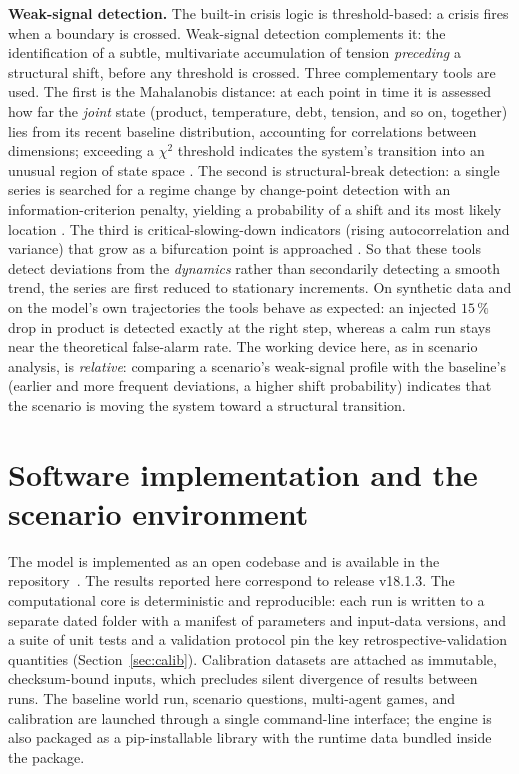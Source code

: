 \documentclass[a4paper,fleqn]{cas-sc}
\begin{document}
\textbf{Weak-signal detection.} The built-in crisis logic is threshold-based: a crisis fires when a
boundary is crossed. Weak-signal detection complements it: the identification of a subtle,
multivariate accumulation of tension \emph{preceding} a structural shift, before any threshold is
crossed. Three complementary tools are used. The first is the Mahalanobis distance: at each point in
time it is assessed how far the \emph{joint} state (product, temperature, debt, tension, and so on,
together) lies from its recent baseline distribution, accounting for correlations between
dimensions; exceeding a $\chi^2$ threshold indicates the system's transition into an unusual region
of state space \citep{mahalanobis1936,wilson1931}. The second is structural-break detection: a
single series is searched for a regime change by change-point detection with an information-criterion
penalty, yielding a probability of a shift and its most likely location \citep{schwarz1978}. The
third is critical-slowing-down indicators (rising autocorrelation and variance) that grow as a
bifurcation point is approached \citep{scheffer2009}. So that these tools detect deviations from the
\emph{dynamics} rather than secondarily detecting a smooth trend, the series are first reduced to
stationary increments. On synthetic data and on the model's own trajectories the tools behave as
expected: an injected $15\,\%$ drop in product is detected exactly at the right step, whereas a calm
run stays near the theoretical false-alarm rate. The working device here, as in scenario analysis,
is \emph{relative}: comparing a scenario's weak-signal profile with the baseline's (earlier and more
frequent deviations, a higher shift probability) indicates that the scenario is moving the system
toward a structural transition.

\section{Software implementation and the scenario environment}
\label{sec:repo}

The model is implemented as an open codebase and is available in the repository~\citep{theclimateguy2026gim}. 
The results reported here correspond to release
v18.1.3. The computational core is deterministic and
reproducible: each run is written to a separate dated folder with a manifest of parameters and
input-data versions, and a suite of unit tests and a validation protocol pin the key
retrospective-validation quantities (Section~\ref{sec:calib}). Calibration datasets are attached as
immutable, checksum-bound inputs, which precludes silent divergence of results between runs. The
baseline world run, scenario questions, multi-agent games, and calibration are launched through a
single command-line interface; the engine is also packaged as a pip-installable library with the
runtime data bundled inside the package.
\end{document}
